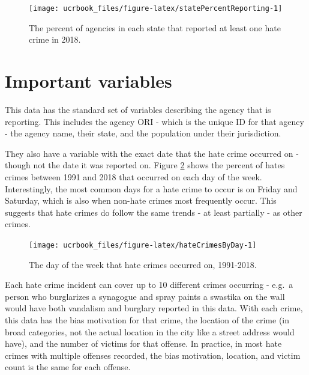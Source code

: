 \documentclass[
  12pt,
  openany]{book}
\begin{document}
\begin{figure}

{\centering \texttt{[image: ucrbook\_files/figure-latex/statePercentReporting-1]} 

}

\caption{The percent of agencies in each state that reported at least one hate crime in 2018.}\label{fig:statePercentReporting}
\end{figure}

\hypertarget{important-variables-6}{%
\section{Important variables}\label{important-variables-6}}

This data has the standard set of variables describing the agency that is reporting. This includes the agency ORI - which is the unique ID for that agency - the agency name, their state, and the population under their jurisdiction.

They also have a variable with the exact date that the hate crime occurred on - though not the date it was reported on. Figure \ref{fig:hateCrimesByDay} shows the percent of hates crimes between 1991 and 2018 that occurred on each day of the week. Interestingly, the most common days for a hate crime to occur is on Friday and Saturday, which is also when non-hate crimes most frequently occur. This suggests that hate crimes do follow the same trends - at least partially - as other crimes.

\begin{figure}

{\centering \texttt{[image: ucrbook\_files/figure-latex/hateCrimesByDay-1]} 

}

\caption{The day of the week that hate crimes occurred on, 1991-2018.}\label{fig:hateCrimesByDay}
\end{figure}

Each hate crime incident can cover up to 10 different crimes occurring - e.g.~a person who burglarizes a synagogue and spray paints a swastika on the wall would have both vandalism and burglary reported in this data. With each crime, this data has the bias motivation for that crime, the location of the crime (in broad categories, not the actual location in the city like a street address would have), and the number of victims for that offense. In practice, in most hate crimes with multiple offenses recorded, the bias motivation, location, and victim count is the same for each offense.
\end{document}
